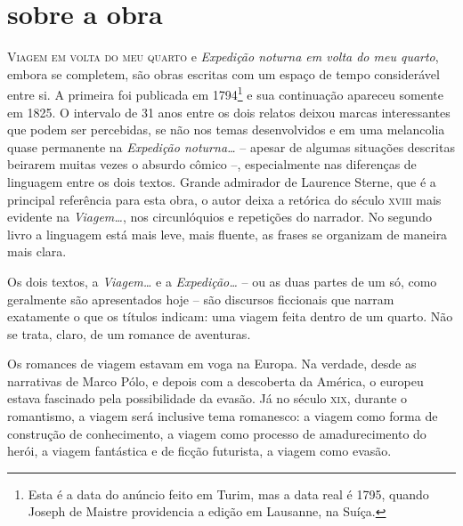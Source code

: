 
\section{sobre a obra}

\textsc{Viagem em volta do meu quarto} e \textit{Expedição noturna em
volta do meu quarto}, embora se completem, são obras escritas com um
espaço de tempo considerável entre si. A primeira foi publicada em
1794\footnote{ Esta é a data do anúncio feito em Turim, mas a data real
é 1795, quando Joseph de Maistre providencia a edição em Lausanne, na
Suíça.}  e sua continuação apareceu somente em 1825. O intervalo de 31
anos entre os dois relatos deixou marcas interessantes que podem ser
percebidas, se não nos temas desenvolvidos e em uma melancolia quase
permanente na \textit{Expedição noturna\ldots} -- apesar de algumas
situações descritas beirarem muitas vezes o absurdo cômico --,
especialmente nas diferenças de linguagem entre os dois textos. Grande
admirador de Laurence Sterne, que é a principal referência para esta
obra, o autor deixa a retórica do século \textsc{xviii} mais evidente na
\textit{Viagem\ldots}, nos circunlóquios e repetições do narrador. No
segundo livro a linguagem está mais leve, mais fluente, as frases se
organizam de maneira mais clara.

 Os dois textos, a \textit{Viagem\ldots} e a \textit{Expedição\ldots} -- ou as
duas partes de um só, como geralmente são apresentados hoje -- são
discursos ficcionais que narram exatamente o que os títulos indicam:
uma viagem feita dentro de um quarto. Não se trata, claro, de um
romance de aventuras. 

Os romances de viagem estavam em voga na Europa. Na verdade, desde as
narrativas de Marco Pólo, e depois com a descoberta da América, o
europeu estava fascinado pela possibilidade da evasão. Já no século
\textsc{xix}, durante o romantismo, a viagem será inclusive tema romanesco: a
viagem como forma de construção de conhecimento, a viagem como processo
de amadurecimento do herói, a viagem fantástica e de ficção futurista,
a viagem como evasão.

